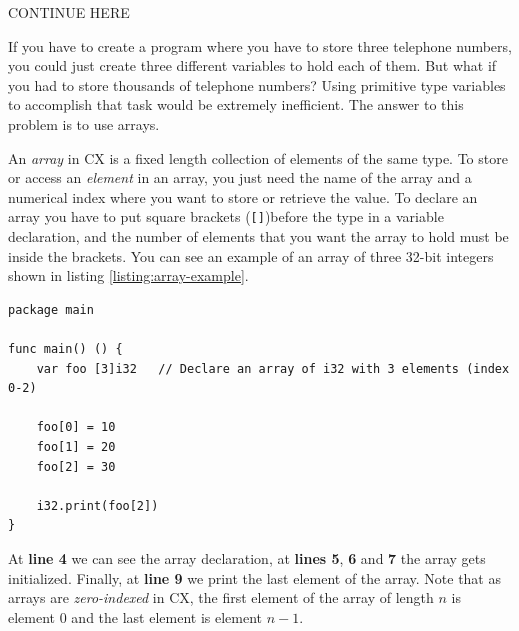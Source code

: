 \documentclass[11pt,fleqn,openany]{book} %
\begin{document}
CONTINUE HERE


If you have to create a program where you have to store three telephone numbers, you could just create three different variables to hold each of them. But what if you had to store thousands of telephone numbers? Using primitive type variables to accomplish that task would be extremely inefficient. The answer to this problem is to use arrays.

An \textit{array} in CX is a fixed length collection of elements of the same type. To store or access an \textit{element} in an array, you just need the name of the array and a numerical index where you want to store or retrieve the value. To declare an array you have to put square brackets (\texttt{[]})before the type in a variable declaration, and the number of elements that you want the array to hold must be inside the brackets. You can see an example of an array of three 32-bit integers shown in listing \ref{listing:array-example}.

\begin{lstlisting}[caption={Array example},captionpos=b,label={listing:array-example}]
package main

func main() () {
	var foo [3]i32   // Declare an array of i32 with 3 elements (index 0-2)
	
	foo[0] = 10
	foo[1] = 20
	foo[2] = 30

	i32.print(foo[2])
}
\end{lstlisting}

At \textbf{line 4} we can see the array declaration, at \textbf{lines 5}, \textbf{6} and \textbf{7} the array gets initialized. Finally, at \textbf{line 9} we print the last element of the array. Note that as arrays are \textit{zero-indexed} in CX, the first element of the array of length $n$ is element 0 and the last element is element $n-1$.
\end{document}
